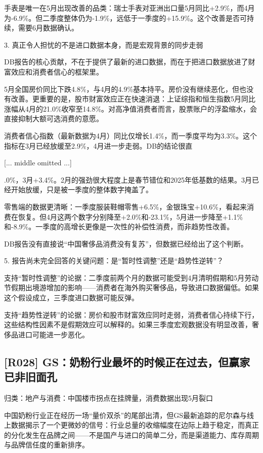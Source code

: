 \documentclass[11pt]{ctexart}
\begin{document}
手表是唯一在5月出现改善的品类：瑞士手表对亚洲出口量5月同比+2.9\%，而4月为-6.9\%。但二季度整体仍为-1.9\%，远低于一季度的+15.9\%。这个改善是否可持续，需要6月数据确认。

3. 真正令人担忧的不是进口数据本身，而是宏观背景的同步走弱

DB报告的核心贡献，不在于提供了最新的进口数据，而在于把进口数据放进了财富效应和消费者信心的框架里。

5月全国房价同比下跌4.8\%，与4月的4.9\%基本持平。房价没有继续恶化，但也没有改善。更重要的是，股市财富效应正在快速消退：上证综指和恒生指数5月同比涨幅从4月的21.0\%收窄至14.8\%。对高净值消费者而言，股票账户的浮盈缩水，会直接抑制大额可选消费的意愿。

消费者信心指数（最新数据为4月）同比仅增长1.4\%，而一季度平均为3.3\%。这个指标在3月已经放缓至2.9\%，4月进一步走弱。DB的结论很直

[... middle omitted ...]

.0\%，3月+3.4\%。2月的强劲很大程度上是春节错位和2025年低基数的结果。3月已经开始放缓，只是被一季度的整体数字掩盖了。

零售端的数据更清晰：一季度服装鞋帽零售+6.5\%，金银珠宝+10.6\%，看起来消费在恢复。但4月这两个数字分别降至+2.0\%和-23.1\%，5月进一步降至+1.1\%和-8.9\%。一季度的高增长更像是一次性的补偿性消费，而非趋势性改善。

DB报告没有直接说“中国奢侈品消费没有复苏”，但数据已经给出了这个判断。

5. 报告尚未完全回答的关键问题：是“暂时性调整”还是“趋势性逆转”？

支持“暂时性调整”的论据：二季度前两个月的数据可能受到4月清明假期和5月劳动节假期出境游增加的影响——消费者在海外购买奢侈品，导致进口数据偏低。如果这个假设成立，三季度进口数据可能反弹。

支持“趋势性逆转”的论据：房价和股市财富效应同时走弱，消费者信心持续下行，这些结构性因素不是假期效应可以解释的。如果三季度宏观数据没有明显改善，奢侈品进口可能进一步恶化。

\subsection{[R028] GS：奶粉行业最坏的时候正在过去，但赢家已非旧面孔}
{\small\color{refgray}归类：地产与消费：中国楼市拐点在挂牌量，消费数据出现5月裂口}

中国奶粉行业正在经历一场“量价双杀”的尾部出清，但GS最新追踪的尼尔森与线上数据揭示了一个更微妙的信号：行业总量的收缩幅度在边际上趋于稳定，而真正的分化发生在品牌之间——不是国产与进口的简单二分，而是渠道能力、库存周期与品牌信任度的重新排序。
\end{document}
